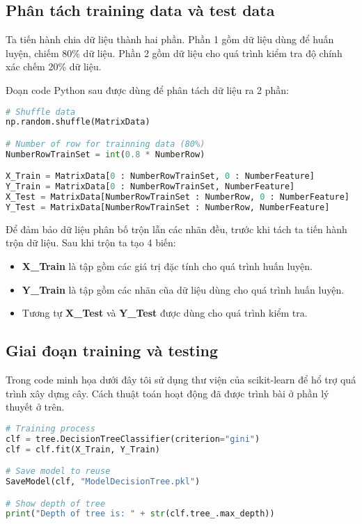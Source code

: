 \documentclass[../main-report.tex]{subfiles}
\begin{document}
\subsection{Phân tách training data và test data}
Ta tiến hành chia dữ liệu thành hai phần. Phần 1 gồm dữ liệu dùng để huấn luyện, chiếm 80\% dữ liệu. Phần 2 gồm dữ liệu cho quá trình kiểm tra độ chính xác chếm 20\% dữ liệu.

Đoạn code Python sau được dùng để phân tách dữ liệu ra 2 phần:

\begin{lstlisting}[language=Python]
# Shuffle data
np.random.shuffle(MatrixData)

# Number of row for trainning data (80%)
NumberRowTrainSet = int(0.8 * NumberRow)

X_Train = MatrixData[0 : NumberRowTrainSet, 0 : NumberFeature]
Y_Train = MatrixData[0 : NumberRowTrainSet, NumberFeature]
X_Test = MatrixData[NumberRowTrainSet : NumberRow, 0 : NumberFeature]
Y_Test = MatrixData[NumberRowTrainSet : NumberRow, NumberFeature]
\end{lstlisting}

Để đảm bảo dữ liệu phân bố trộn lẫn các nhãn đều, trước khi tách ta tiến hành trộn dữ liệu. Sau khi trộn ta tạo 4 biến:

\begin{itemize}
\item \textbf{X\_Train} là tập gồm các giá trị đặc tính cho quá trình huấn luyện.
\item \textbf{Y\_Train} là tập gồm các nhãn cũa dữ liệu dùng cho quá trình huấn luyện.
\item Tương tự \textbf{X\_Test} và \textbf{Y\_Test} được dùng cho quá trình kiểm tra.
\end{itemize}

\subsection{Giai đoạn training và testing}
Trong code minh họa dưới đây tôi sử dụng thư viện của scikit-learn để hổ trợ quá trình xây dựng cây. Cách thuật toán hoạt động đã được trình bài ở phần lý thuyết ở trên.

\begin{lstlisting}[language=Python]
# Training process
clf = tree.DecisionTreeClassifier(criterion="gini")
clf = clf.fit(X_Train, Y_Train)

# Save model to reuse
SaveModel(clf, "ModelDecisionTree.pkl")

# Show depth of tree
print("Depth of tree is: " + str(clf.tree_.max_depth))
\end{lstlisting}
\end{document}

